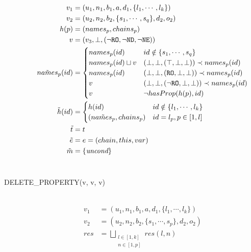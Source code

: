 \begin{description}
\[\begin{aligned}
    v_1 &= (u_1, n_1, b_1, a, d_1, \{l_1, \cdots, l_k\}) \\
    v_2 &= (u_2, n_2, b_2, \{s_1, \cdots, s_q\}, d_2, o_2) \\
    h(p) &= (names_p, chains_p) \\
    v &= (v_3, \bot, (\lnot \mathtt{RO}, \lnot \mathtt{ND}, \lnot
      \mathtt{NE})) \\
    \tilde{names}_p(id) &= \begin{cases} 
      names_p(id) & id \notin \{s_1, \cdots, s_q\} \\
      names_p(id) \sqcup v & 
	(\bot, \bot, ( \top, \bot, \bot)) \prec names_p(id) \\
      names_p(id) & 
	(\bot, \bot, (\mathtt{RO},\bot, \bot)) \prec names_p(id) \\
      v & 
	(\bot, \bot, (\lnot \mathtt{RO},\bot, \bot)) \prec names_p(id) \\
      v & \lnot hasProp(h(p), id) \\
    \end{cases} \\
    \tilde{h}(id) &=
    \begin{cases}
      h(id) & id \notin \{l_1, \cdots, l_k\} \\
      (\tilde{names_p}, chains_p) & id = l_p, p \in [1,l]  \\
    \end{cases}
    \\ 
    \tilde{t} &= t \\
    \tilde{e} &= e = (chain, this, var) \\ 
  \tilde{m} &= \{\emph{uncond}\} \\
  \end{aligned}
  \]
  \\
  \item[{\small\ttfamily DELETE\_PROPERTY(v\ts{1}, v\ts{2}, v\ts{3})}] ~\\%
  \[
  \begin{aligned}
    v_1 &= (u_1, n_1, b_1, a, d_1, \{l_1, \cdots, l_k\}) \\
    v_2 &= (u_2, n_2, b_2, \{s_1, \cdots, s_p\}, d_2, o_2) \\
    res &= \bigsqcup_{\substack{l\in[1,k] \\ n\in[1,p]}} res(l, n) \\

\end{aligned}\]
\end{description}
